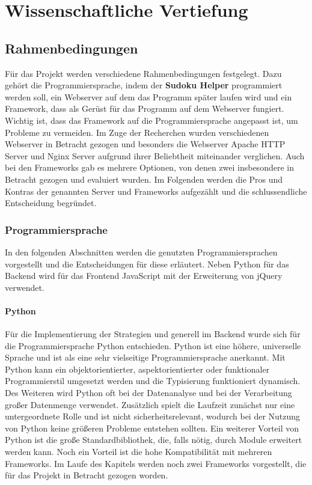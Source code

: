 
\part{Wissenschaftliche Vertiefung}

\chapter{Rahmenbedingungen}
Für das Projekt werden verschiedene Rahmenbedingungen festgelegt. Dazu gehört die Programmiersprache, indem der \textbf{Sudoku Helper} programmiert werden soll, ein Webserver auf dem das Programm später laufen wird und ein Framework, dass als Gerüst für das Programm auf dem Webserver fungiert. Wichtig ist, dass das Framework auf die Programmiersprache angepasst ist, um Probleme zu vermeiden. Im Zuge der Recherchen wurden verschiedenen Webserver in Betracht gezogen und besonders die Webserver Apache HTTP Server und Nginx Server aufgrund ihrer Beliebtheit miteinander verglichen. Auch bei den Frameworks gab es mehrere Optionen, von denen zwei insbesondere in Betracht gezogen und evaluiert wurden. Im Folgenden werden die Pros und Kontras  der genannten Server und Frameworks aufgezählt und die schlussendliche Entscheidung begründet.

\section{Programmiersprache}
In den folgenden Abschnitten werden die genutzten Programmiersprachen vorgestellt und die Entscheidungen für diese erläutert. Neben Python für das Backend wird für das Frontend JavaScript mit der Erweiterung von jQuery verwendet.

\subsection{Python}
Für die Implementierung der Strategien und generell im Backend wurde sich für die Programmiersprache Python entschieden. Python ist eine höhere, universelle Sprache und ist als eine sehr vielseitige Programmiersprache anerkannt. Mit Python kann ein objektorientierter, aspektorientierter oder funktionaler Programmierstil umgesetzt werden und die Typisierung funktioniert dynamisch. Des Weiteren wird Python oft bei der Datenanalyse und bei der Verarbeitung großer Datenmenge verwendet. Zusätzlich spielt die Laufzeit zunächst nur eine untergeordnete Rolle und ist nicht sicherheitsrelevant, wodurch bei der Nutzung von Python keine größeren Probleme entstehen sollten.
Ein weiterer Vorteil von Python ist die große Standardbibliothek, die, falls nötig, durch Module erweitert werden kann. Noch ein Vorteil ist die hohe Kompatibilität mit mehreren Frameworks. Im Laufe des Kapitels werden noch zwei Frameworks vorgestellt, die für das Projekt in Betracht gezogen worden.

